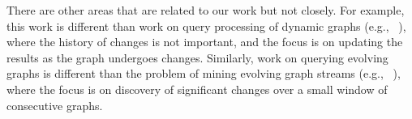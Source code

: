There are other areas that are related to our work but not closely.
For example, this work is different than work on query processing of
dynamic graphs (e.g., ~\cite{Mondal2012}), where the history of
changes is not important, and the focus is on updating the results as
the graph undergoes changes.  Similarly, work on querying evolving
graphs is different than the problem of mining evolving graph streams
(e.g., ~\cite{Liu2010}), where the focus is on discovery of
significant changes over a small window of consecutive graphs.

